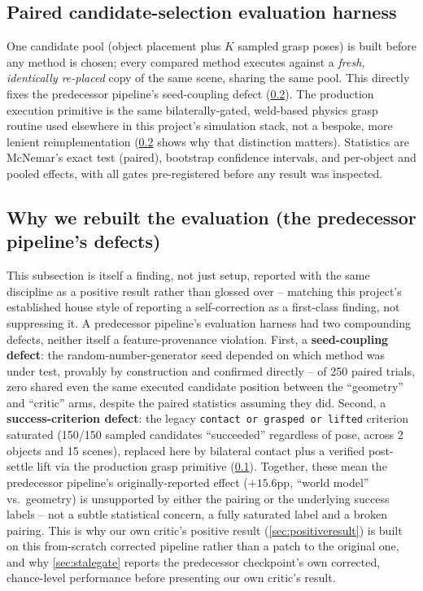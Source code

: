 \documentclass[journal]{IEEEtran}
\begin{document}
\subsection{Paired candidate-selection evaluation harness}
\label{sec:harness}

One candidate pool (object placement plus $K$ sampled grasp poses) is built
before any method is chosen; every compared method executes against a
\emph{fresh, identically re-placed} copy of the same scene, sharing the
same pool. This directly fixes the predecessor pipeline's seed-coupling
defect (\cref{sec:diagnosis}). The production execution primitive is the
same bilaterally-gated, weld-based physics grasp routine used elsewhere in
this project's simulation stack, not a bespoke, more lenient
reimplementation (\cref{sec:diagnosis} shows why that distinction
matters). Statistics are McNemar's exact test (paired), bootstrap
confidence intervals, and per-object and pooled effects, with all gates
pre-registered before any result was inspected.

\subsection{Why we rebuilt the evaluation (the predecessor pipeline's
defects)}
\label{sec:diagnosis}

This subsection is itself a finding, not just setup, reported with the
same discipline as a positive result rather than glossed over -- matching
this project's established house style of reporting a self-correction as
a first-class finding, not suppressing it. A predecessor pipeline's
evaluation harness had two compounding defects, neither itself a
feature-provenance violation. First, a \textbf{seed-coupling defect}: the
random-number-generator seed depended on which method was under test,
provably by construction and confirmed directly -- of 250 paired trials,
zero shared even the same executed candidate position between the
``geometry'' and ``critic'' arms, despite the paired statistics assuming
they did. Second, a \textbf{success-criterion defect}: the legacy
\texttt{contact or grasped or lifted} criterion saturated (150/150 sampled
candidates ``succeeded'' regardless of pose, across 2 objects and 15
scenes), replaced here by bilateral contact plus a verified post-settle
lift via the production grasp primitive (\cref{sec:harness}). Together,
these mean the predecessor pipeline's originally-reported effect
($+15.6$pp, ``world model'' vs.\ geometry) is unsupported by either the
pairing or the underlying success labels -- not a subtle statistical
concern, a fully saturated label and a broken pairing. This is why our own
critic's positive result (\cref{sec:positiveresult}) is built on this
from-scratch corrected pipeline rather than a patch to the original one,
and why \cref{sec:stalegate} reports the predecessor checkpoint's own
corrected, chance-level performance before presenting our own critic's
result.
\end{document}
